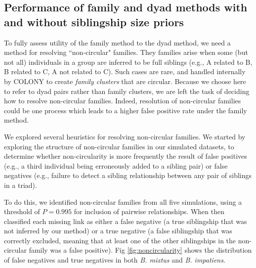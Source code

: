 \documentclass[12pt]{article}
\begin{document}
\subsection{Performance of family and dyad methods with and without siblingship size priors}

To fully assess utility of the family method to the dyad method, we need a method for resolving ``non-circular" families. They families arise when some (but not all) individuals in a group are inferred to be full siblings (e.g., A related to B, B related to C, A not related to C). Such cases are rare, and handled internally by COLONY to create \emph{family clusters} that are circular. Because we choose here to refer to dyad pairs rather than family clusters, we are left the task of deciding how to resolve non-circular families. Indeed, resolution of non-circular families could be one process which leads to a higher false positive rate under the family method.

We explored several heuristics for resolving non-circular families. We started by exploring the structure of non-circular families in our simulated datasets, to determine whether non-circularity is more frequently the result of false positives (e.g., a third individual being erroneously added to a sibling pair) or false negatives (e.g., failure to detect a sibling relationship between any pair of siblings in a triad).

To do this, we identified non-circular families from all five simulations, using a threshold of $P = 0.995$ for inclusion of pairwise relationships. When then classified each missing link as either a false negative (a true siblingship that was not inferred by our method) or a true negative (a false siblingship that was correctly excluded, meaning that at least one of the other siblingships in the non-circular family was a false positive). Fig \ref{fig:noncircularity} shows the distribution of false negatives and true negatives in both \emph{B. mixtus} and \emph{B. impatiens}.
\end{document}
